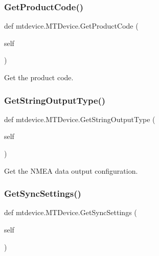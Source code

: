 \subsubsection{\texorpdfstring{Get\+Product\+Code()}{GetProductCode()}}
{\footnotesize\ttfamily def mtdevice.\+M\+T\+Device.\+Get\+Product\+Code (\begin{DoxyParamCaption}\item[{}]{self }\end{DoxyParamCaption})}

\begin{DoxyVerb}Get the product code.\end{DoxyVerb}
 \mbox{\label{classmtdevice_1_1MTDevice_ab265cda5a90f2089720c4028a6d64d45}} 
\subsubsection{\texorpdfstring{Get\+String\+Output\+Type()}{GetStringOutputType()}}
{\footnotesize\ttfamily def mtdevice.\+M\+T\+Device.\+Get\+String\+Output\+Type (\begin{DoxyParamCaption}\item[{}]{self }\end{DoxyParamCaption})}

\begin{DoxyVerb}Get the NMEA data output configuration.\end{DoxyVerb}
 \mbox{\label{classmtdevice_1_1MTDevice_af518193ff364835d40017be2a0fdde45}} 
\subsubsection{\texorpdfstring{Get\+Sync\+Settings()}{GetSyncSettings()}}
{\footnotesize\ttfamily def mtdevice.\+M\+T\+Device.\+Get\+Sync\+Settings (\begin{DoxyParamCaption}\item[{}]{self }\end{DoxyParamCaption})}

